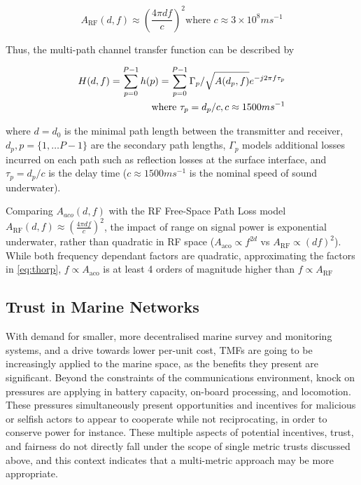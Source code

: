 \begin{equation}
  \label{eq:fspl}
  A_{\text{RF}}(d,f) \approx \left( \frac{4\pi d f}{c} \right)^2
  \text{where }c\approx 3\times10^8ms^{-1}
\end{equation}


Thus, the multi-path channel transfer function can be described by 

\begin{align}
  \label{eq:acomultipath}
  H(d,f) =\sum_{p=0}^{P-1} h(p) = \sum_{p=0}^{P-1} \Gamma_p / \sqrt{A(d_p,f)}e^{-j 2 \pi f \tau_p} \\
  \text{where } \tau_p = d_p/c, c \approx 1500 ms^{-1} \notag
\end{align}

where $d=d_0$ is the minimal path length between the transmitter and receiver, $d_p,p=\{1,\dots P-1\}$ are the secondary path lengths, $\Gamma_p$ models additional losses incurred on each path such as reflection losses at the surface interface, and $\tau_p = d_p/c$ is the delay time ($c \approx 1500 ms^{-1}$ is the nominal speed of sound underwater).


Comparing $A_{aco}(d,f)$ with the RF Free-Space Path Loss model $A_{\text{RF}}(d,f) \approx \left( \frac{4\pi d f}{c} \right)^2$, the impact of range on signal power is exponential underwater, rather than quadratic in RF space ($A_{\text{aco}} \propto f^{2d}$ vs $A_{\text{RF}} \propto (df)^2$). 
While both frequency dependant factors are quadratic, approximating the factors in \eqref{eq:thorp}, $f\propto A_{\text{aco}}$ is at least 4 orders of magnitude higher than $f\propto A_{\text{RF}}$


\subsection{Trust in Marine Networks}\label{sec:trust_in_marine}

With demand for smaller, more decentralised marine survey and monitoring systems, and a drive towards lower per-unit cost, TMFs are going to be increasingly applied to the marine space, as the benefits they present are significant.
Beyond the constraints of the communications environment, knock on pressures are applying in battery capacity, on-board processing, and locomotion.
These pressures simultaneously present opportunities and incentives for malicious or selfish actors to appear to cooperate while not reciprocating, in order to conserve power for instance.
These multiple aspects of potential incentives, trust, and fairness do not directly fall under the scope of single metric trusts discussed above, and this context indicates that a multi-metric approach may be more appropriate.



